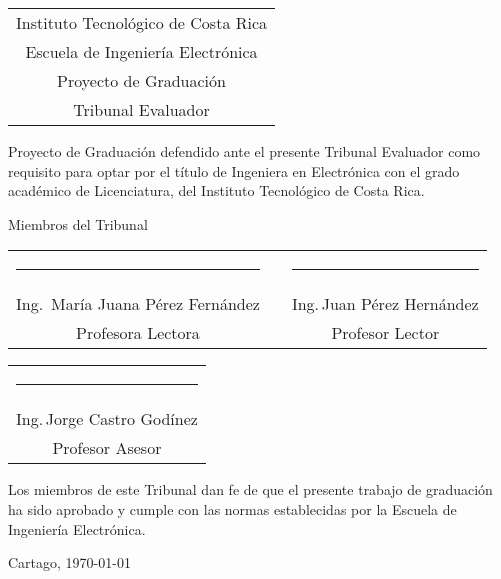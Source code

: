 \thispagestyle{empty}


\begin{center}
  \begin{tabular}{c}
    Instituto Tecnológico de Costa Rica \\
    Escuela de Ingeniería Electrónica \\
    Proyecto de Graduación \\
    Tribunal Evaluador
  \end{tabular}
\end{center}

\vfill

Proyecto de Graduación defendido ante el presente Tribunal Evaluador como 
requisito para optar por el título de Ingeniera en Electrónica con el grado 
académico de Licenciatura, del Instituto Tecnológico de Costa Rica.  

\vfill

\vspace*{20mm}
\begin{center}
 Miembros del Tribunal
\end{center}
\vspace*{8mm}

\vfill

\begin{center}
  \begin{tabular}{ccc}
    \rule{70mm}{0.5pt} & \rule{15mm}{0pt} & \rule{70mm}{0.5pt} \\
    Ing.\, María Juana Pérez Fernández && Ing.\,Juan Pérez Hernández \\
    Profesora Lectora && Profesor Lector
  \end{tabular}
  
  \vspace{10mm}

  \begin{tabular}{c}
    \rule{6cm}{0.5pt} \\
    Ing.\,Jorge Castro Godínez \\
    Profesor Asesor
  \end{tabular}
\end{center}

\vfill


Los miembros de este Tribunal dan fe de que el presente trabajo de graduación
ha sido aprobado y cumple con las normas establecidas por la Escuela de
Ingeniería Electrónica.

\vfill

\begin{center}
  Cartago, \today \par
\end{center}

\cleardoublepage


